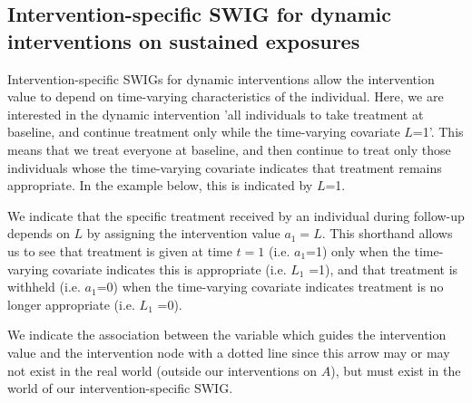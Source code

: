 \documentclass[a4paper]{report}
\begin{document}
\vspace{3mm}

\subsection{Intervention-specific SWIG for dynamic interventions on sustained exposures}

Intervention-specific SWIGs for dynamic interventions allow the intervention value to depend on time-varying characteristics of the individual. Here, we are interested in the dynamic intervention 'all individuals to take treatment at baseline, and continue treatment only while the time-varying covariate $L$=1'. This means that we treat everyone at baseline, and then continue to treat only those individuals whose the time-varying covariate indicates that treatment remains appropriate. In the example below, this is indicated by $L$=1.

We indicate that the specific treatment received by an individual during follow-up depends on $L$ by assigning the intervention value $a_1 = L$. This shorthand allows us to see that treatment is given at time $t=1$ (i.e. $a_1$=1) only when the time-varying covariate indicates this is appropriate (i.e. $L_1$ =1), and that treatment is withheld (i.e. $a_1$=0) when the time-varying covariate indicates treatment is no longer appropriate (i.e. $L_1$ =0). 

We indicate the association between the variable which guides the intervention value and the intervention node with a dotted line since this arrow may or may not exist in the real world (outside our interventions on $A$), but must exist in the world of our intervention-specific SWIG. 

\vspace{3mm}
\end{document}
